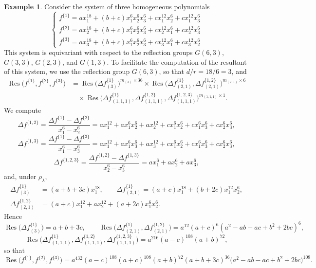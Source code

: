 \documentclass[12pt]{amsart}
\theoremstyle{definition}
\newtheorem{example}[theorem]{Example}
\newcommand{\Res}{\operatorname{Res}}
\begin{document}
\begin{example}
\label{ex:second}
Consider the system of three homogeneous polynomials
\[
\begin{cases}
f^{\{1\}} = ax_1^{18} + (b+c)x_1^6x_2^6x_3^6 + cx_1^{12}x_2^6 + cx_1^{12}x_3^6 \\
f^{\{2\}} = ax_2^{18} + (b+c)x_1^6x_2^6x_3^6 + cx_2^{12}x_1^6 + cx_2^{12}x_3^6 \\
f^{\{3\}} = ax_3^{18} + (b+c)x_1^6x_2^6x_3^6 + cx_3^{12}x_1^6 + cx_3^{12}x_2^6
\end{cases}
\]
This system is equivariant with respect to the reflection groups $G(6,3)$, $G(3,3)$, $G(2,3)$, and $G(1,3)$. To facilitate the computation of the resultant of this system, we use the reflection group $G(6,3)$, so that $d/r = 18/6 = 3$, and
\begin{align*}
\Res\big(f^{\{1\}},f^{\{2\}},f^{\{3\}}\big) &= \Res\big(\Delta f^{\{1\}}_{(3)}\big)^{m_{(3)}\times 36} \times \Res\big(\Delta f^{\{1\}}_{(2,1)},\Delta f^{\{1,2\}}_{(2,1)}\big)^{m_{(2,1)}\times 6} \\
&\quad\times \Res\big(\Delta f^{\{1\}}_{(1,1,1)},\Delta f^{\{1,2\}}_{(1,1,1)},\Delta f^{\{1,2,3\}}_{(1,1,1)}\big)^{m_{(1,1,1)}\times 1}.
\end{align*}
We compute
\[
\Delta f^{\{1,2\}} = \frac{\Delta f^{\{1\}}-\Delta f^{\{2\}}}{x_1^6-x_2^6} = ax_1^{12}+ax_1^6x_2^6+ax_2^{12}+cx_1^6x_2^6+cx_1^6x_3^6+cx_2^6x_3^6,
\]
\[
\Delta f^{\{1,3\}} = \frac{\Delta f^{\{1\}}-\Delta f^{\{3\}}}{x_1^6-x_3^6} = ax_1^{12}+ax_1^6x_3^6+ax_3^{12}+cx_1^6x_2^6+cx_1^6x_3^6+cx_2^6x_3^6,
\]
\[
\Delta f^{\{1,2,3\}} = \frac{\Delta f^{\{1,2\}}-\Delta f^{\{1,3\}}}{x_2^6-x_3^6} = ax_1^6+ax_2^6+ax_3^6,
\]
and, under $\rho_\lambda$,
\begin{align*}
\Delta f^{\{1\}}_{(3)} &= (a+b+3c)x_1^{18}, \qquad \Delta f^{\{1\}}_{(2,1)} = (a+c)x_1^{18}+(b+2c)x_1^{12}x_2^6, \\
\Delta f^{\{1,2\}}_{(2,1)} &= (a+c)x_1^{12}+ax_2^{12}+(a+2c)x_1^6x_2^6.
\end{align*}
Hence
\[
\Res\big(\Delta f^{\{1\}}_{(3)}\big) = a+b+3c, \qquad \Res\big(\Delta f^{\{1\}}_{(2,1)},\Delta f^{\{1,2\}}_{(2,1)}\big) = a^{12}(a+c)^6(a^2-ab-ac+b^2+2bc)^6,
\]
\[
\Res\big(\Delta f^{\{1\}}_{(1,1,1)},\Delta f^{\{1,2\}}_{(1,1,1)},\Delta f^{\{1,2,3\}}_{(1,1,1)}\big) = a^{216}(a-c)^{108}(a+b)^{72},
\]
so that
\[
\Res\big(f^{\{1\}},f^{\{2\}},f^{\{3\}}\big) = a^{432}(a-c)^{108}(a+c)^{108}(a+b)^{72}(a+b+3c)^{36}\big(a^2-ab-ac+b^2+2bc\big)^{108}.
\]
\end{example}
\end{document}
